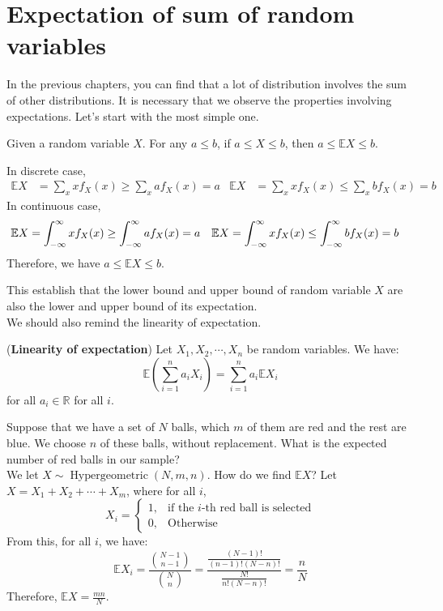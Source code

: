 \documentclass{huhtakm-template-book}
\newcommand{\expect}{\mathbb{E}}
\DeclareMathOperator{\Hypergeometric}{Hypergeometric}
\begin{document}
\section{Expectation of sum of random variables}
In the previous chapters, you can find that a lot of distribution involves the sum of other distributions. It is necessary that we observe the properties involving expectations. Let's start with the most simple one.
\begin{thm}
	Given a random variable $X$. For any $a\leq b$, if $a\leq X\leq b$, then $a\leq\expect{X}\leq b$.
\end{thm}
\begin{proofing}
	In discrete case,
	\begin{align*}
		\expect{X}&=\sum_{x}xf_{X}(x)\geq\sum_{x}af_{X}(x)=a & \expect{X}&=\sum_{x}xf_{X}(x)\leq\sum_{x}bf_{X}(x)=b
	\end{align*}
	In continuous case,
	\begin{align*}
		\expect{X}&=\intinfty xf_{X}(x)\geq\intinfty af_{X}(x)=a & \expect{X}&=\intinfty xf_{X}(x)\leq\intinfty bf_{X}(x)=b
	\end{align*}
	Therefore, we have $a\leq\expect{X}\leq b$.
\end{proofing}
This establish that the lower bound and upper bound of random variable $X$ are also the lower and upper bound of its expectation.\\
We should also remind the linearity of expectation.
\begin{thm}(\textbf{Linearity of expectation}) Let $X_{1},X_{2},\cdots,X_{n}$ be random variables. We have:
	\begin{equation*}
		\expect\left(\sum_{i=1}^{n}a_{i}X_{i}\right)=\sum_{i=1}^{n}a_{i}\expect X_{i}
	\end{equation*} 
	for all $a_{i}\in\mathbb{R}$ for all $i$.
\end{thm}
\begin{eg}
	Suppose that we have a set of $N$ balls, which $m$ of them are red and the rest are blue. We choose $n$ of these balls, without replacement. What is the expected number of red balls in our sample?\\
	We let $X\sim\Hypergeometric(N,m,n)$. How do we find $\expect{X}$? Let $X=X_{1}+X_{2}+\cdots+X_{m}$, where for all $i$,
	\begin{equation*}
		X_{i}=\begin{cases}
			1, &\text{if the $i$-th red ball is selected}\\
			0, &\text{Otherwise}
		\end{cases}
	\end{equation*}
	From this, for all $i$, we have:
	\begin{equation*}
		\expect{X_{i}}=\frac{\binom{N-1}{n-1}}{\binom{N}{n}}=\frac{\frac{(N-1)!}{(n-1)!(N-n)!}}{\frac{N!}{n!(N-n)!}}=\frac{n}{N}
	\end{equation*}
	Therefore, $\expect{X}=\frac{mn}{N}$.
\end{eg}
\end{document}
